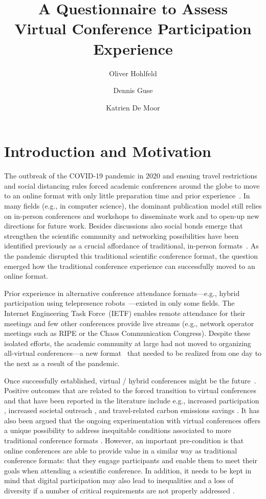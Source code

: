 \documentclass[sigconf]{acmart}
\title{A Questionnaire to Assess\\Virtual Conference Participation Experience}
\author{Oliver Hohlfeld}
\affiliation{\institution{Brandenburg University of Technology}}
\author{Dennis Guse}
\affiliation{}
\author{Katrien De Moor}
\affiliation{\institution{NTNU}}
\begin{document}
\maketitle

\sloppypar
\pagestyle{plain}

\section{Introduction and Motivation}
The outbreak of the COVID-19 pandemic in 2020 and ensuing travel restrictions and social distancing rules forced academic conferences around the globe to move to an online format with only little preparation time and prior experience~\cite{bonifati2020holding, ASPLOS,alex2020flexibility}.
In many fields (e.g., in computer science), the dominant publication model still relies on in-person conferences and workshops to disseminate work and to open-up new directions for future work.
Besides discussions also social bonds emerge that strengthen the scientific community and networking possibilities have been identified previously as a crucial affordance of traditional, in-person formats~\cite{raby2021moving}.
As the pandemic disrupted this traditional scientific conference format, the question emerged how the traditional conference experience can successfully moved to an online format. 


Prior experience in alternative conference attendance formats---e.g., hybrid participation using telepresence robots~\cite{RobotAttendance, RobotAttendance2018}---existed in only some fields.
The Internet Engineering Task Force~(IETF) enables remote attendance for their meetings and few other conferences provide live streams (e.g., network operator meetings such as RIPE or the Chaos Communication Congress).
Despite these isolated efforts, the academic community at large had not moved to organizing all-virtual conferences---a new format~\cite{Price457} that needed to be realized from one day to the next as a result of the pandemic.

Once successfully established, virtual / hybrid conferences might be the future~\cite{virtConferencesFuture}.
Positive outcomes that are related to the forced transition to virtual conferences and that have been reported in the literature include e.g., increased participation \cite{castelvecchi2020loving}, increased societal outreach \cite{foramitti2021virtues}, and travel-related carbon emissions savings \cite{klower2020analysis}. 
It has also been argued that the ongoing experimentation with virtual conferences offers a unique possibility to address inequitable conditions associated to more traditional conference formats \cite{niner2020pandemic}.
However, an important pre-condition is that online conferences are able to provide value in a similar way as traditional conference formats: that they engage participants and enable them to meet their goals when attending a scientific conference.
In addition, it needs to be kept in mind that digital participation may also lead to inequalities and a loss of diversity if a number of critical requirements are not properly addressed \cite{niner2020pandemic}.
\end{document}
